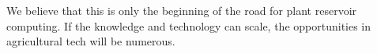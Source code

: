 \documentclass[10pt,a4paper,journal]{IEEEtran}
\begin{document}
We believe that this is only the beginning of the road for plant reservoir computing.
If the knowledge and technology can scale, the opportunities in agricultural tech will be numerous.




\renewbibmacro*{doi+eprint+url}{%
\printfield{doi}%
\newunit\newblock%
\iftoggle{bbx:eprint}{%
\usebibmacro{eprint}%
}{}%
\newunit\newblock%
\iffieldundef{doi}{%
\usebibmacro{url}}%
{}%
}


\renewcommand*{\bibfont}{\scriptsize}
\printbibliography
\end{document}
